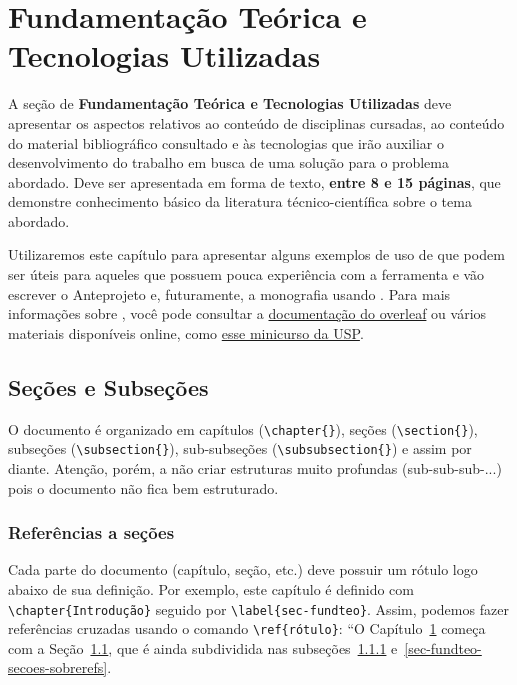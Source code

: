 \chapter{Fundamentação Teórica e Tecnologias Utilizadas}
\label{sec-fundteo}

A seção de \textbf{Fundamentação Teórica e Tecnologias Utilizadas} deve apresentar
os aspectos relativos ao conteúdo de disciplinas cursadas, ao conteúdo do material
bibliográfico consultado e às tecnologias que irão auxiliar o desenvolvimento do trabalho
em busca de uma solução para o problema abordado. Deve ser apresentada em forma de
texto, \textbf{entre 8 e 15 páginas}, que demonstre conhecimento básico da literatura técnico-científica sobre o tema abordado.

Utilizaremos este capítulo para apresentar alguns exemplos de uso de \latex que podem ser úteis para aqueles que possuem pouca experiência com a ferramenta e vão escrever o Anteprojeto e, futuramente, a monografia usando \latex. Para mais informações sobre \latex, você pode consultar a  \href{https://www.overleaf.com/learn}{documentação do overleaf} ou vários materiais disponíveis online, como  \href{https://www.ime.usp.br/~viviane/MAP2212/minicurso.pdf}{esse minicurso da USP}.



\section{Seções e Subseções}
\label{sec-fundteo-secoes}

O documento é organizado em capítulos (\texttt{\textbackslash chapter\{\}}), seções (\texttt{\textbackslash section\{\}}), subseções (\texttt{\textbackslash subsection\{\}}), sub-subseções (\texttt{\textbackslash subsubsection\{\}}) e assim por diante. Atenção, porém, a não criar estruturas muito profundas (sub-sub-sub-...) pois o documento não fica bem estruturado.


\subsection{Referências a seções}
\label{sec-fundteo-secoes-refs}

Cada parte do documento (capítulo, seção, etc.) deve possuir um rótulo logo abaixo de sua definição. Por exemplo, este capítulo é definido com \texttt{\textbackslash chapter\{Introdução\}} seguido por \texttt{\textbackslash label\{sec-fundteo\}}. Assim, podemos fazer referências cruzadas usando o comando \texttt{\textbackslash ref\{rótulo\}}: ``O Capítulo~\ref{sec-fundteo} começa com a Seção~\ref{sec-fundteo-secoes}, que é ainda subdividida nas subseções~\ref{sec-fundteo-secoes-refs} e~\ref{sec-fundteo-secoes-sobrerefs}.


